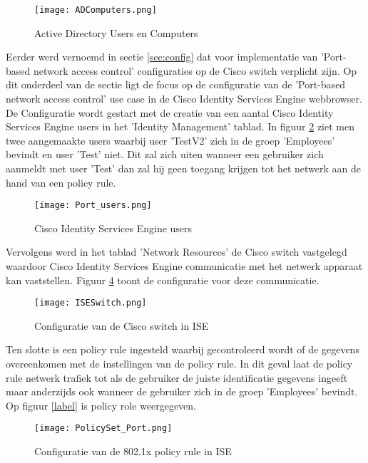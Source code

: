 \begin{figure}[H]
	\centering
	\texttt{[image: ADComputers.png]}
	\caption{Active Directory Users en Computers}
	\label{fig:AD_Cisco2}
\end{figure}
 \newline
 	Eerder werd vernoemd in sectie \ref{sec:config} dat voor implementatie van 'Port-based network access control' configuraties op de Cisco switch verplicht zijn. Op dit onderdeel van de sectie ligt de focus op de configuratie van de 'Port-based network access control' use case in de Cisco Identity Services Engine webbrowser. 
 	\newline
 	\newline
 	De Configuratie wordt gestart met de creatie van een aantal Cisco Identity Services Engine users in het 'Identity Management' tablad. In figuur \ref{fig:users} ziet men twee aangemaakte users waarbij user 'TestV2' zich in de groep 'Employees' bevindt en user 'Test' niet. Dit zal zich uiten wanneer een gebruiker zich aanmeldt met user 'Test' dan zal hij geen toegang krijgen tot het netwerk aan de hand van een policy rule.
 	
 	\begin{figure}[H]
 		\centering
 		\texttt{[image: Port\_users.png]}
 		\caption{Cisco Identity Services Engine users}%
 		\label{fig:users}%
 	\end{figure}
 	
 	Vervolgens werd in het tablad 'Network Resources' de Cisco switch vastgelegd waardoor Cisco Identity Services Engine communicatie met het netwerk apparaat kan vaststellen. Figuur \ref{fig:ISESwitch} toont de configuratie voor deze communicatie. 
 	
 	 	\begin{figure}[H]
 		\centering
 		\texttt{[image: ISESwitch.png]}
 		\caption{Configuratie van de Cisco switch in ISE}%
 		\label{fig:ISESwitch}%
 		\end{figure}
 	
 	Ten slotte is een policy rule ingesteld waarbij gecontroleerd wordt of de gegevens overeenkomen met de instellingen van de policy rule. In dit geval laat de policy rule netwerk trafiek tot als de gebruiker de juiste identificatie gegevens ingeeft maar anderzijds ook wanneer de gebruiker zich in de groep 'Employees' bevindt. Op figuur \ref{label} is policy role weergegeven.
 	
	 	 \begin{figure}[H]
		\centering
		\texttt{[image: PolicySet\_Port.png]}
		\caption{Configuratie van de 802.1x policy rule in ISE}%
		\label{fig:ISESwitch}%
		\end{figure}

